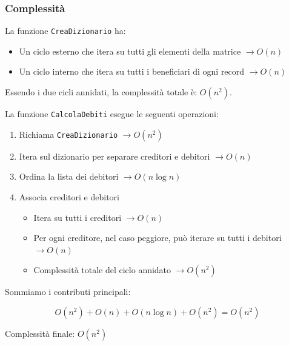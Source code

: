 \subsubsection{Complessità}

La funzione \texttt{CreaDizionario} ha:

\begin{itemize}
    \item Un ciclo esterno che itera su tutti gli elementi della matrice $\rightarrow O(n)$
    \item Un ciclo interno che itera su tutti i beneficiari di ogni record $\rightarrow O(n)$
\end{itemize}

Essendo i due cicli annidati, la complessità totale è: $O(n^2)$.

La funzione \texttt{CalcolaDebiti} esegue le seguenti operazioni:

\begin{enumerate}
    \item Richiama \texttt{CreaDizionario} $\rightarrow O(n^2)$
    \item Itera sul dizionario per separare creditori e debitori $\rightarrow O(n)$
    \item Ordina la lista dei debitori  $\rightarrow O(n \log n)$
    \item Associa creditori e debitori
    \begin{itemize}
        \item Itera su tutti i creditori $\rightarrow O(n)$
        \item Per ogni creditore, nel caso peggiore, può iterare su tutti i debitori $\rightarrow O(n)$
        \item Complessità totale del ciclo annidato $\rightarrow O(n^2)$
    \end{itemize}
\end{enumerate}

Sommiamo i contributi principali:

\[ O(n^2) + O(n) + O(n \log n) + O(n^2) = O(n^2) \]

Complessità finale: $O(n^2)$